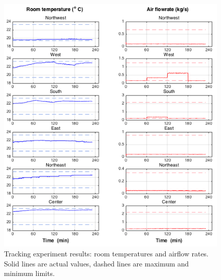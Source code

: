 \begin{figure}[t]
\centering
\includegraphics[scale=0.42]{chapters/building_exp/figures/Track_temp_flow.png}
\caption{Tracking experiment results: room temperatures and airflow rates. Solid lines are actual values, dashed lines are maximum and minimum limits.}
\label{fig:track_temp_flow}
\end{figure}



%


